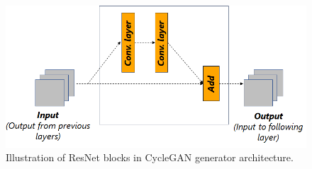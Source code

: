 \vspace*{1.0cm}
\begin{figure}[H]
        \begin{center}
	    \includegraphics[scale=0.65]{images/Implementation/resnetBlocks.png}
	    \caption[Illustration of ResNet blocks in \ac{CycleGAN} generator architecture.]{Illustration of ResNet blocks in \ac{CycleGAN} generator architecture.}
	    \label{fig:resnetBlock}
	    \end{center}
\end{figure}




